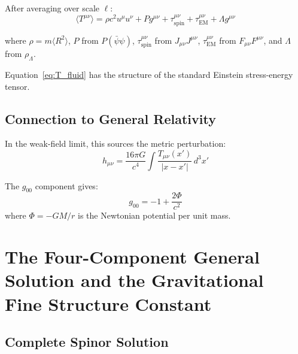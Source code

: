 \documentclass[11pt,a4paper]{article}
\theoremstyle{definition}
\theoremstyle{remark}
\begin{document}
	After averaging over scale $\ell$:
	\begin{equation}
		\langle T^{\mu\nu}\rangle = \rho c^2 u^\mu u^\nu + Pg^{\mu\nu} + \tau^{\mu\nu}_{\mathrm{spin}} + \tau^{\mu\nu}_{\mathrm{EM}} + \Lambda g^{\mu\nu}
		\label{eq:T_fluid}
	\end{equation}
	
	where $\rho=m\langle R^2\rangle$, $P$ from $P(\bar{\psi}\psi)$, $\tau^{\mu\nu}_{\mathrm{spin}}$ from $J_{\mu\nu}J^{\mu\nu}$, $\tau^{\mu\nu}_{\mathrm{EM}}$ from $F_{\mu\nu}F^{\mu\nu}$, and $\Lambda$ from $\rho_\Lambda$.
	
	Equation~\eqref{eq:T_fluid} has the structure of the standard Einstein stress-energy tensor.
	
	\subsection{Connection to General Relativity}
	
	In the weak-field limit, this sources the metric perturbation:
	\begin{equation}
		h_{\mu\nu} = \frac{16\pi G}{c^4}\int\frac{T_{\mu\nu}(x')}{|x-x'|}\,d^3x'
	\end{equation}
	
	The $g_{00}$ component gives:
	\begin{equation}
		g_{00} = -1 + \frac{2\Phi}{c^2}
	\end{equation}
	where $\Phi=-GM/r$ is the Newtonian potential per unit mass.
	
	\section{The Four-Component General Solution and the Gravitational Fine Structure Constant}
	\label{sec:four_component}
	
	\subsection{Complete Spinor Solution}
	
\end{document}
